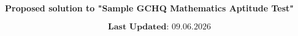 \documentclass[11pt]{article}
\newcommand{\ket}[1]{|{#1}\rangle}
\newcommand{\bra}[1]{\langle{#1}|}
\begin{document}
\begin{center}
\Large
\bf Proposed solution to "Sample GCHQ Mathematics Aptitude Test"\\
\end{center}

\vspace{4mm}
$$\textbf{Last Updated: } 09.06.2026$$
$$$$

\newcommand{\BestQuantumStateEver}{\ket{00}+\ket{11}}
\newcommand{\braPhi}{\bra{\phi}}
\newcommand{\ketPhi}{\ket{\phi}}

\newcommand{\ketN}{\ket{n}}
\newcommand{\braN}{\bra{n}}

\newcommand{\ketK}{\ket{k}}
\newcommand{\braK}{\bra{k}}



\end{document}
